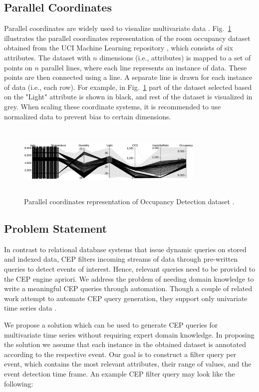 \documentclass[conference]{IEEEtran}  %
\begin{document}
\subsection{Parallel Coordinates}
Parallel coordinates are widely used to visualize multivariate data \cite{IEEEexample:ParallelCoordinates}.  Fig.~\ref{fig:parallcor} illustrates the parallel coordinates representation of the room occupancy dataset obtained from the UCI Machine Learning repository \cite{IEEEexample:Ocupancy}, which consists of six attributes. The dataset with $n$ dimensions (i.e., attributes) is mapped to a set of points on $n$ parallel lines, where each line represents an instance of data. These points are then connected using a line. A separate line is drawn for each instance of data (i.e., each row). For example, in Fig.~\ref{fig:parallcor} part of the dataset selected based on the "Light" attribute is shown in black, and rest of the dataset is visualized in grey. When scaling these coordinate systems, it is recommended to use normalized data to prevent bias to certain dimensions.

\begin{figure}
\includegraphics[width=9cm,height=3.5cm]{occupancy_d3.png}
\caption{Parallel coordinates representation of Occupancy Detection dataset \cite{IEEEexample:Ocupancy}.}
\label{fig:parallcor}
\squeezeup
\end{figure}


\subsection{Problem Statement} 
In contrast to relational database systems that issue dynamic queries on stored and indexed data, CEP filters incoming streams of data through pre-written queries to detect events of interest. Hence, relevant queries need to be provided to the CEP engine apriori. We address the problem of needing domain knowledge to write a meaningful CEP queries through automation. Though a couple of related work attempt to automate CEP query generation, they support only univariate time series data \cite{IEEEexample:autoCEP}.

We propose a solution which can be used to generate CEP queries for multivariate time series without requiring expert domain knowledge. In proposing the solution we assume that each instance in the obtained dataset is annotated according to the respective event. Our goal is to construct a filter query per event, which contains the most relevant attributes, their range of values, and the event detection time frame. An example CEP filter query may look like the following:
\end{document}
